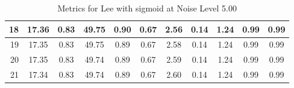 \begin{table}[htb]
\begin{tabular}{|r|cccccccccc|}
      18 &  17.36 &  0.83 &  49.75 &  0.90 &  0.67 &  2.56 &  0.14 &  1.24 &  0.99 &  0.99  \\ \hline 
      19 &  17.35 &  0.83 &  49.75 &  0.89 &  0.67 &  2.58 &  0.14 &  1.24 &  0.99 &  0.99  \\ \hline 
      20 &  17.35 &  0.83 &  49.74 &  0.89 &  0.67 &  2.59 &  0.14 &  1.24 &  0.99 &  0.99  \\ \hline 
      21 &  17.34 &  0.83 &  49.74 &  0.89 &  0.67 &  2.60 &  0.14 &  1.24 &  0.99 &  0.99  \\ \hline 
    \end{tabular}
    \caption{Metrics for Lee with sigmoid at Noise Level 5.00}
    \end{table}


